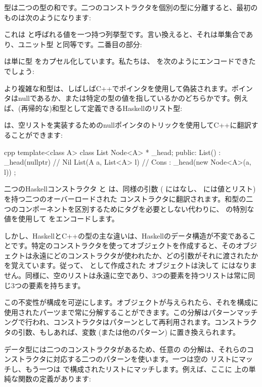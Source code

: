  型は二つの型の和です。二つのコンストラクタを個別の型に分離すると、最初のものは次のようになります: 

これは  と呼ばれる値を一つ持つ列挙型です。言い換えると、それは単集合であり、ユニット型 \code{()} と同等です。二番目の部分: 

は単に型  をカプセル化しています。私たちは、 を次のようにエンコードできたでしょう: 

より複雑な和型は、しばしばC++でポインタを使用して偽装されます。ポインタはnullであるか、または特定の型の値を指しているかのどちらかです。例えば、(再帰的な)和型として定義できるHaskellのリスト型: 

は、空リストを実装するためのnullポインタのトリックを使用してC++に翻訳することができます: 

\begin{snip}{cpp}
template<class A>
class List { 
    Node<A> * _head;
public:
    List() : _head(nullptr) {} // Nil
    List(A a, List<A> l)       // Cons
      : _head(new Node<A>(a, l))
    {}
};
\end{snip}
二つのHaskellコンストラクタ  と  は、同様の引数 ( にはなし、 には値とリスト) を持つ二つのオーバーロードされた  コンストラクタに翻訳されます。和型の二つのコンポーネントを区別するためにタグを必要としない代わりに、  の特別な  値を使用して  をエンコードします。

しかし、HaskellとC++の型の主な違いは、Haskellのデータ構造が不変であることです。特定のコンストラクタを使ってオブジェクトを作成すると、そのオブジェクトは永遠にどのコンストラクタが使われたか、どの引数がそれに渡されたかを覚えています。従って、  として作成された  オブジェクトは決して  にはなりません。同様に、空のリストは永遠に空であり、3つの要素を持つリストは常に同じ3つの要素を持ちます。

この不変性が構成を可逆にします。オブジェクトが与えられたら、それを構成に使用されたパーツまで常に分解することができます。この分解はパターンマッチングで行われ、コンストラクタはパターンとして再利用されます。コンストラクタの引数、もしあれば、変数 (または他のパターン) に置き換えられます。

 データ型には二つのコンストラクタがあるため、任意の  の分解は、それらのコンストラクタに対応する二つのパターンを使います。一つは空の  リストにマッチし、もう一つは  で構成されたリストにマッチします。例えば、ここに  上の単純な関数の定義があります: 

